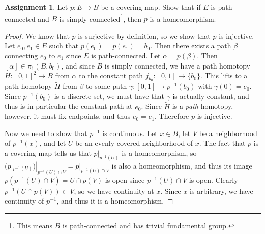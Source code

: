\documentclass[12pt]{article}
\theoremstyle{definition}
\newtheorem{ex}{Assignment}
\begin{document}
\begin{ex}
	Let $p : E \to B$ be a covering map.
	Show that if $E$ is path-connected and $B$ is simply-connected\footnote{This means $B$ is path-connected and has trivial fundamental group.}, then $p$ is a homeomorphism.
\end{ex}
\begin{proof}
	We know that $p$ is surjective by definition, so we show that $p$ is injective.
	Let $e_0, e_1 \in E$ such that $p(e_0) = p(e_1) = b_0$.
	Then there exists a path $\beta$ connecting $e_0$ to $e_1$ since $E$ is path-connected.
	Let $\alpha = p(\beta)$.
	Then $[\alpha] \in \pi_1(B, b_0)$, and since $B$ is simply connected, we have a path homotopy $H : [0, 1]^2 \to B$ from $\alpha$ to the constant path $f_{b_0} : [0, 1] \to \lbrace b_0 \rbrace$.
	This lifts to a path homotopy $\widetilde{H}$ from $\beta$ to some path $\gamma : [0, 1] \to p^{-1}(b_0)$ with $\gamma(0) = e_0$.
	Since $p^{-1}(b_0)$ is a discrete set, we must have that $\gamma$ is actually constant, and thus is in particular the constant path at $e_0$.
	Since $\widetilde{H}$ is a \textit{path} homotopy, however, it must fix endpoints, and thus $e_0 = e_1$.
	Therefore $p$ is injective.

	Now we need to show that $p^{-1}$ is continuous.
	Let $x \in B$, let $V$ be a neighborhood of $p^{-1}(x)$, and let $U$ be an evenly covered neighborhood of $x$.
	The fact that $p$ is a covering map tells us that $p|_{p^{-1}(U)}$ is a homeomorphism, so $(p|_{p^{-1}(U)})|_{p^{-1}(U) \cap V} = p|_{p^{-1}(U) \cap V}$ is also a homeomorphism, and thus its image $p(p^{-1}(U) \cap V) = U \cap p(V)$ is open since $p^{-1}(U) \cap V$ is open.
	Clearly $p^{-1}(U \cap p(V)) \subset V$, so we have continuity at $x$.
	Since $x$ is arbitrary, we have continuity of $p^{-1}$, and thus it is a homeomorphism.
\end{proof}
\end{document}
